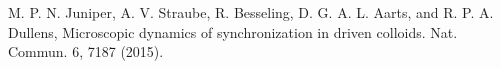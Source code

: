 \documentclass[prb,preprint]{revtex4}
\begin{document}
\begin{thebibliography}{99}

 M. P. N. Juniper, A. V. Straube, R. Besseling, D. G. A. L. Aarts, and R. P. A. Dullens, Microscopic dynamics of synchronization in driven colloids. Nat. Commun. 6, 7187 (2015).













\end{thebibliography}
\end{document}
